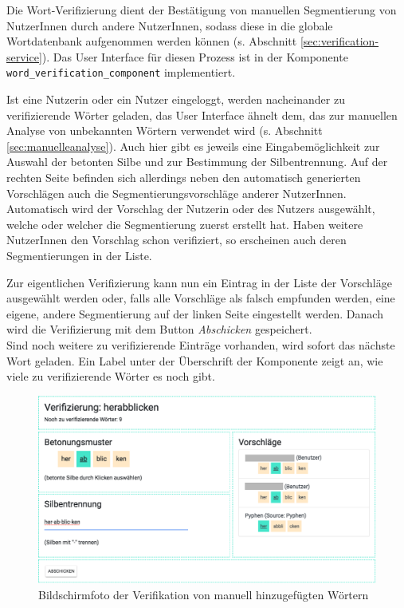 Die Wort-Verifizierung dient der Bestätigung von manuellen Segmentierung von NutzerInnen durch andere NutzerInnen, sodass diese in die globale Wortdatenbank aufgenommen werden können (s. Abschnitt \ref{sec:verification-service}). Das User Interface für diesen Prozess ist in der Komponente \texttt{word\_verification\_component} implementiert.

Ist eine Nutzerin oder ein Nutzer eingeloggt, werden nacheinander zu verifizierende Wörter geladen, das User Interface ähnelt dem, das zur manuellen Analyse von unbekannten Wörtern verwendet wird (s. Abschnitt \ref{sec:manuelleanalyse}). Auch hier gibt es jeweils eine Eingabemöglichkeit zur Auswahl der betonten Silbe und zur Bestimmung der Silbentrennung. Auf der rechten Seite befinden sich allerdings neben den automatisch generierten Vorschlägen auch die Segmentierungsvorschläge anderer NutzerInnen. Automatisch wird der Vorschlag der Nutzerin oder des Nutzers ausgewählt, welche oder welcher die Segmentierung zuerst erstellt hat. Haben weitere NutzerInnen den Vorschlag schon verifiziert, so erscheinen auch deren Segmentierungen in der Liste.

Zur eigentlichen Verifizierung kann nun ein Eintrag in der Liste der Vorschläge ausgewählt werden oder, falls alle Vorschläge als falsch empfunden werden, eine eigene, andere Segmentierung auf der linken Seite eingestellt werden. Danach wird die Verifizierung mit dem Button \textit{Abschicken} gespeichert.\\
Sind noch weitere zu verifizierende Einträge vorhanden, wird sofort das nächste Wort geladen. Ein Label unter der Überschrift der Komponente zeigt an, wie viele zu verifizierende Wörter es noch gibt.

\begin{figure}[h!]
	\centering
	\includegraphics[width=.8\linewidth]{figures/frontend/verifizierung}
	\caption{Bildschirmfoto der Verifikation von manuell hinzugefügten Wörtern}
	\label{fig:frontend-verification}
\end{figure}